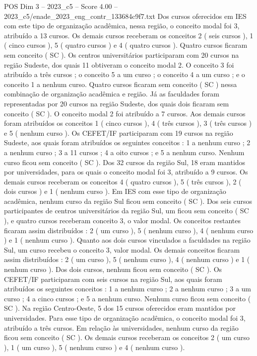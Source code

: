 \begin{textsample}{POS Dim 3 – 2023\_c5 – Score 4.00 – 2023\_c5/enade\_2023\_eng\_contr\_133684c9f7.txt}
Dos cursos oferecidos em IES com este tipo de organização acadêmica, nessa região, o conceito modal foi 3, atribuído a 13 cursos.
Os demais cursos receberam os conceitos 2 ( seis cursos ), 1 ( cinco cursos ), 5 ( quatro cursos ) e 4 ( quatro cursos ).
Quatro cursos ficaram sem conceito ( SC ).
Os centros universitários participaram com 20 cursos na região Sudeste, dos quais 11 obtiveram o conceito modal 2.
O conceito 3 foi atribuído a três cursos ; o conceito 5 a um curso ; o conceito 4 a um curso ; e o conceito 1 a nenhum curso.
Quatro cursos ficaram sem conceito ( SC ) nessa combinação de organização acadêmica e região.
Já as faculdades foram representadas por 20 cursos na região Sudeste, dos quais dois ficaram sem conceito ( SC ).
O conceito modal 2 foi atribuído a 7 cursos.
Aos demais cursos foram atribuídos os conceitos 1 ( cinco cursos ), 4 ( três cursos ), 3 ( três cursos ) e 5 ( nenhum curso ).
Os CEFET/IF participaram com 19 cursos na região Sudeste, aos quais foram atribuídos os seguintes conceitos : 1 a nenhum curso ; 2 a nenhum curso ; 3 a 11 cursos ; 4 a oito cursos ; e 5 a nenhum curso.
Nenhum curso ficou sem conceito ( SC ).
Dos 32 cursos da região Sul, 18 eram mantidos por universidades, para os quais o conceito modal foi 3, atribuído a 9 cursos.
Os demais cursos receberam os conceitos 4 ( quatro cursos ), 5 ( três cursos ), 2 ( dois cursos ) e 1 ( nenhum curso ).
Em IES com esse tipo de organização acadêmica, nenhum curso da região Sul ficou sem conceito ( SC ).
Dos seis cursos participantes de centros universitários da região Sul, um ficou sem conceito ( SC ), e quatro cursos receberam conceito 3, o valor modal.
Os conceitos restantes ficaram assim distribuídos : 2 ( um curso ), 5 ( nenhum curso ), 4 ( nenhum curso ) e 1 ( nenhum curso ).
Quanto aos dois cursos vinculados a faculdades na região Sul, um curso recebeu o conceito 3, valor modal.
Os demais conceitos ficaram assim distribuídos : 2 ( um curso ), 5 ( nenhum curso ), 4 ( nenhum curso ) e 1 ( nenhum curso ).
Dos dois cursos, nenhum ficou sem conceito ( SC ).
Os CEFET/IF participaram com seis cursos na região Sul, aos quais foram atribuídos os seguintes conceitos : 1 a nenhum curso ; 2 a nenhum curso ; 3 a um curso ; 4 a cinco cursos ; e 5 a nenhum curso.
Nenhum curso ficou sem conceito ( SC ).
Na região Centro-Oeste, 5 dos 15 cursos oferecidos eram mantidos por universidades.
Para esse tipo de organização acadêmica, o conceito modal foi 3, atribuído a três cursos.
Em relação às universidades, nenhum curso da região ficou sem conceito ( SC ).
Os demais cursos receberam os conceitos 2 ( um curso ), 1 ( um curso ), 5 ( nenhum curso ) e 4 ( nenhum curso ).

\end{textsample}
